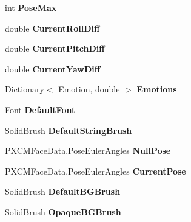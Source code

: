 \begin{DoxyCompactItemize}
int {\bfseries Pose\+Max}\hspace{0.3cm}{\ttfamily  [get, set]}
\item 
\mbox{\label{class_real_sense_1_1_model_a7ba288087bcec5d88a34064df08fbf20}} 
double {\bfseries Current\+Roll\+Diff}\hspace{0.3cm}{\ttfamily  [get, set]}
\item 
\mbox{\label{class_real_sense_1_1_model_a9701d5e1b5c733f70349f94ec7fee978}} 
double {\bfseries Current\+Pitch\+Diff}\hspace{0.3cm}{\ttfamily  [get, set]}
\item 
\mbox{\label{class_real_sense_1_1_model_ae5d9b51742c782f5f79c38761cfaee3c}} 
double {\bfseries Current\+Yaw\+Diff}\hspace{0.3cm}{\ttfamily  [get, set]}
\item 
Dictionary$<$ Emotion, double $>$ \textbf{ Emotions}\hspace{0.3cm}{\ttfamily  [get, set]}
\item 
\mbox{\label{class_real_sense_1_1_model_a1e12c6ceac3f412e6b452148b1a97bb1}} 
Font {\bfseries Default\+Font}\hspace{0.3cm}{\ttfamily  [get, set]}
\item 
\mbox{\label{class_real_sense_1_1_model_aaee076946f30b272e403d39afe033b4e}} 
Solid\+Brush {\bfseries Default\+String\+Brush}\hspace{0.3cm}{\ttfamily  [get, set]}
\item 
\mbox{\label{class_real_sense_1_1_model_af6cb31aea9e1e0fd3ef87c9380e92193}} 
P\+X\+C\+M\+Face\+Data.\+Pose\+Euler\+Angles {\bfseries Null\+Pose}\hspace{0.3cm}{\ttfamily  [get, set]}
\item 
\mbox{\label{class_real_sense_1_1_model_a5d30cb7ac89ab7528623a695056096c4}} 
P\+X\+C\+M\+Face\+Data.\+Pose\+Euler\+Angles {\bfseries Current\+Pose}\hspace{0.3cm}{\ttfamily  [get, set]}
\item 
\mbox{\label{class_real_sense_1_1_model_a05161bcafb94b553304268ab16861a84}} 
Solid\+Brush {\bfseries Default\+B\+G\+Brush}\hspace{0.3cm}{\ttfamily  [get]}
\item 
\mbox{\label{class_real_sense_1_1_model_a14272eb96159aac12a818e2e15c36cb0}} 
Solid\+Brush {\bfseries Opaque\+B\+G\+Brush}\hspace{0.3cm}{\ttfamily  [get]}
\item 
\mbox{\label{class_real_sense_1_1_model_a5a20efa42d5391f0a8156d45f676fc34}} 

\end{DoxyCompactItemize}
